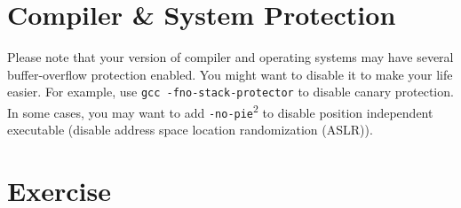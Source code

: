 \documentclass[a4paper, 10pt]{article}
\begin{document}
\section*{Compiler \& System Protection}

Please note that your version of compiler and operating systems may have several buffer-overflow protection enabled.
You might want to disable it to make your life easier.
For example, use \texttt{gcc -fno-stack-protector} to disable canary protection.
In some cases, you may want to add \texttt{-no-pie}\textsuperscript{2} to disable position independent executable
(disable address space location randomization (ASLR)).


\section*{Exercise}

\end{document}
